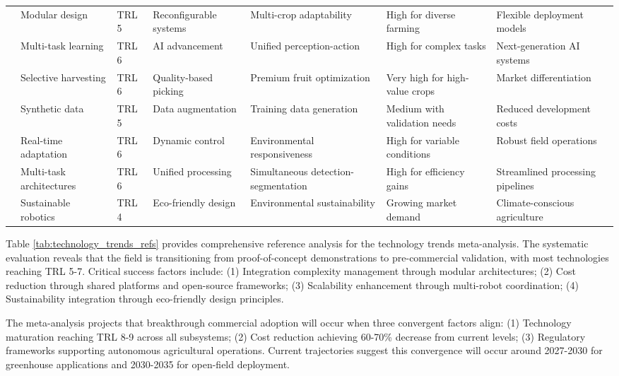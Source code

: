 \documentclass[a4paper,fleqn]{cas-dc}
\begin{document}
\begin{table}[htbp]
\begin{tabular}{p{}p{}p{}p{}p{}p{}p{}}
\cite{lytridis2021overview} & Modular design & TRL 5 & Reconfigurable systems & Multi-crop adaptability & High for diverse farming & Flexible deployment models \\

\cite{li2023multi} & Multi-task learning & TRL 6 & AI advancement & Unified perception-action & High for complex tasks & Next-generation AI systems \\

\cite{suresh2023selective} & Selective harvesting & TRL 6 & Quality-based picking & Premium fruit optimization & Very high for high-value crops & Market differentiation \\

\cite{heschl2024synthset} & Synthetic data & TRL 5 & Data augmentation & Training data generation & Medium with validation needs & Reduced development costs \\

\cite{gai2022fruit} & Real-time adaptation & TRL 6 & Dynamic control & Environmental responsiveness & High for variable conditions & Robust field operations \\

\cite{li2023mta} & Multi-task architectures & TRL 6 & Unified processing & Simultaneous detection-segmentation & High for efficiency gains & Streamlined processing pipelines \\

\cite{gruda2024three} & Sustainable robotics & TRL 4 & Eco-friendly design & Environmental sustainability & Growing market demand & Climate-conscious agriculture \\

\bottomrule
\end{tabular}
\end{table}

Table \ref{tab:technology_trends_refs} provides comprehensive reference analysis for the technology trends meta-analysis. The systematic evaluation reveals that the field is transitioning from proof-of-concept demonstrations to pre-commercial validation, with most technologies reaching TRL 5-7. Critical success factors include: (1) Integration complexity management through modular architectures; (2) Cost reduction through shared platforms and open-source frameworks; (3) Scalability enhancement through multi-robot coordination; (4) Sustainability integration through eco-friendly design principles.

The meta-analysis projects that breakthrough commercial adoption will occur when three convergent factors align: (1) Technology maturation reaching TRL 8-9 across all subsystems; (2) Cost reduction achieving 60-70\% decrease from current levels; (3) Regulatory frameworks supporting autonomous agricultural operations. Current trajectories suggest this convergence will occur around 2027-2030 for greenhouse applications and 2030-2035 for open-field deployment.
\end{document}

